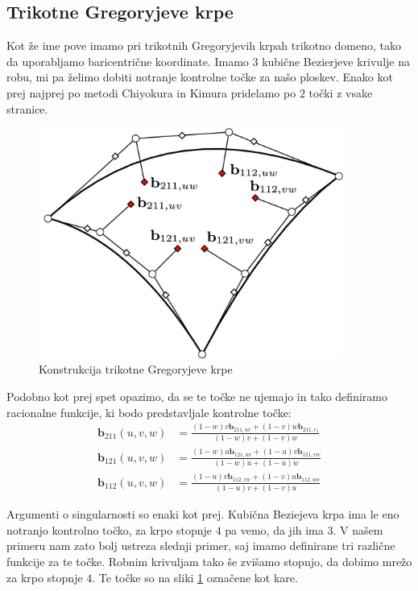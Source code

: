 \documentclass[a4paper,regno]{article}
\newcommand{\tbf}{\textbf}
\begin{document}
\subsection{Trikotne Gregoryjeve krpe}
Kot že ime pove imamo pri trikotnih Gregoryjevih krpah trikotno domeno, tako da uporabljamo baricentrične koordinate. Imamo $3$ kubične Bezierjeve krivulje na robu, mi pa želimo dobiti notranje kontrolne točke za našo ploskev. Enako kot prej najprej po metodi Chiyokura in Kimura pridelamo po $2$ točki z vsake stranice.
\begin{figure}[h]
	\centering
	\includegraphics[width=10cm]{gregory_krpe_trikotna.jpg}
	\caption{Konstrukcija trikotne Gregoryjeve krpe}
	\label{fig:trikotna}
\end{figure}

Podobno kot prej spet opazimo, da se te točke ne ujemajo in tako definiramo racionalne funkcije, ki bodo predstavljale kontrolne točke:
\begin{align*}
\tbf{b}_{211}(u,v,w) &= \frac{(1-w)v \tbf{b}_{211,uv}+(1-v)w\tbf{b}_{211,v_1}}{(1-w)v+(1-v)w} \\
\tbf{b}_{121}(u,v,w) &= \frac{(1-w)u \tbf{b}_{121,uv}+(1-u)v\tbf{b}_{121,vw}}{(1-w)u+(1-u)w} \\
\tbf{b}_{112}(u,v,w) &= \frac{(1-u)v \tbf{b}_{112,vw}+(1-v)u\tbf{b}_{112,uw}}{(1-u)v+(1-v)u} 
\end{align*}

Argumenti o singularnosti so enaki kot prej. Kubična Beziejeva krpa ima le eno notranjo kontrolno točko, za krpo stopnje $4$ pa vemo, da jih ima $3$. V našem primeru nam zato bolj ustreza slednji primer, saj imamo definirane tri različne funkcije za te točke. Robnim krivuljam tako še zvišamo stopnjo, da dobimo mrežo za krpo stopnje $4$. Te točke so na sliki \ref{fig:trikotna} označene kot kare.
\end{document}
